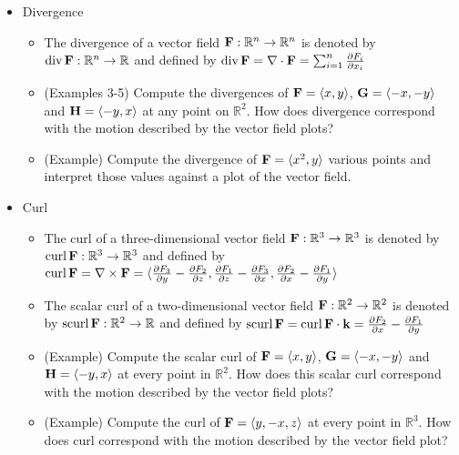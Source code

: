 \documentclass[11pt]{article}
\begin{document}
\begin{itemize}
  \item Divergence
    \begin{itemize}
      \item The divergence of a vector field
        \(\mathbf{F}:\mathbb R^n\to\mathbb R^n\) is denoted by
        \(\textrm{div}\,{\mathbf{F}}:\mathbb R^n\to \mathbb R\) and defined by
        \(\textrm{div}\,{\mathbf{F}} = \nabla \cdot \mathbf{F} = \sum_{i=1}^n \frac{\partial F_i}{\partial x_i}\)
      \item (Examples 3-5) Compute the divergences of \(\mathbf{F}=\langle x,y\rangle\),
        \(\mathbf{G}=\langle-x,-y\rangle\) and \(\mathbf{H}=\langle-y,x\rangle\) at
        any point on \(\mathbb R^2\). How does divergence correspond with
        the motion described by the vector field plots?
      \item (Example) Compute the divergence of \(\mathbf{F}=\langle x^2,y\rangle\) various
        points and interpret those values against a plot of the vector field.
    \end{itemize}
  \item Curl
    \begin{itemize}
      \item The curl of a three-dimensional vector field
        \(\mathbf{F}:\mathbb R^3\to\mathbb R^3\) is denoted by
        \(\textrm{curl}\,{\mathbf{F}}:\mathbb R^3\to\mathbb R^3\) and defined by
        \(
          \textrm{curl}\,{\mathbf{F}}
            =
          \nabla \times \mathbf{F}
            =
          \langle
            \frac{\partial F_3}{\partial y}-\frac{\partial F_2}{\partial z},
            \frac{\partial F_1}{\partial z}-\frac{\partial F_3}{\partial x},
            \frac{\partial F_2}{\partial x}-\frac{\partial F_1}{\partial y}
          \rangle
        \)
      \item The scalar curl of a two-dimensional vector field
        \(\mathbf{F}:\mathbb R^2\to\mathbb R^2\) is denoted by
        \(\textrm{scurl}\,{\mathbf{F}}:\mathbb R^2\to\mathbb R\) and defined by
        \(
          \textrm{scurl}\,{\mathbf{F}}
            =
          \textrm{curl}\,{\mathbf{F}} \cdot \mathbf{k}
            =
          \frac{\partial F_2}{\partial x}-\frac{\partial F_1}{\partial y}
        \)
      \item (Example) Compute the scalar curl of \(\mathbf{F}=\langle x,y\rangle\),
        \(\mathbf{G}=\langle-x,-y\rangle\) and \(\mathbf{H}=\langle-y,x\rangle\) at every point in
        \(\mathbb R^2\).
        How does this scalar curl correspond with
        the motion described by the vector field plots?
      \item (Example) Compute the curl of \(\mathbf{F}=\langle y,-x,z\rangle\) at every
        point in \(\mathbb R^3\). How does curl correspond with the motion
        described by the vector field plot?
    \end{itemize}

\end{itemize}
\end{document}
